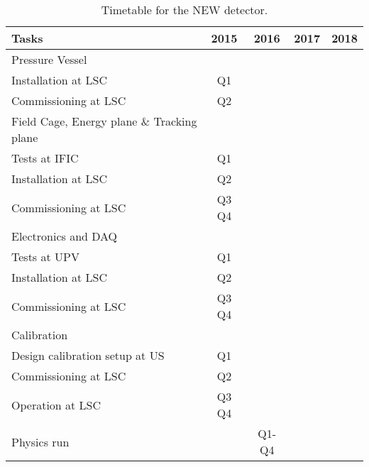 \begin{table}[h!]
\begin{center}
\begin{tabular}{| l | c | c | c | c |}
\hline
Tasks & 2015 & 2016 & 2017 & 2018 \\
\hline
Pressure Vessel & & & &   \\
\hline
Installation at LSC & Q1 & & & \\
Commissioning at LSC & Q2 & & & \\
\hline
Field Cage, Energy plane \& Tracking plane & & & &   \\
\hline
Tests at IFIC & Q1 & & & \\
Installation at LSC & Q2 & & & \\
Commissioning at LSC & Q3 Q4 & & & \\
\hline
Electronics and DAQ & & & &   \\
\hline
Tests at UPV & Q1 & & & \\
Installation at LSC & Q2 & & & \\
Commissioning at LSC & Q3 Q4 & & & \\
\hline
Calibration & & & &   \\
\hline
Design calibration setup at US & Q1 & & & \\
Commissioning at LSC & Q2 & & & \\
Operation at LSC & Q3 Q4 & & & \\
\hline
Physics run & & Q1-Q4& &   \\
\hline
\end{tabular}
\caption{Timetable for the NEW detector.}
\label{tab:schedule_new}
\end{center}
\end{table} 

